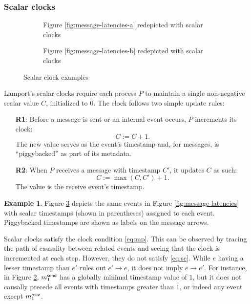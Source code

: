 \documentclass[]             %
{NASA}                       %
\theoremstyle{definition}
\newtheorem{example}[theorem]{Example}
\begin{document}
\subsubsection{Scalar clocks}
\label{sssec:scalar-clocks}
\begin{figure}
  \setlength\belowcaptionskip{5ex}

  \begin{subfigure}{1\textwidth}
    \centering 
    \caption{Figure \ref{fig:message-latencies-a} redepicted with scalar clocks}
    \label{fig:message-latencies-scalar-a}
  \end{subfigure}

  \begin{subfigure}{1\textwidth}
    \centering 
    \caption{Figure \ref{fig:message-latencies-b} redepicted with scalar clocks}
    \label{fig:message-latencies-scalar-b}
  \end{subfigure}

  \caption{Scalar clock examples}
  \label{fig:message-latencies-scalar}
\end{figure}

Lamport's scalar clocks \cite{1978:lamportclocks} require each
process $P$ to maintain a single non-negative scalar value $C$,
initialized to $0$. The clock follows two simple update rules:
\begin{enumerate}
\item[\textbf{R1}:] Before a message is sent or an internal event occurs, $P$
  increments its clock:
  \[C := C + 1.\]
  The new value serves as the event's timestamp and, for messages, is ``piggybacked''
  as part of its metadata.
\item[\textbf{R2}:] When $P$ receives a message with timestamp $C'$, it
  updates $C$ as such:
  \[C := \max(C, C') + 1.\]
  The value is the receive event's timestamp.
\end{enumerate}

\begin{example}
  Figure \ref{fig:message-latencies-scalar} depicts the same events in
  Figure \ref{fig:message-latencies} with scalar timestamps (shown in
  parentheses) assigned to each event. Piggybacked timestamps are
  shown as labels on the message arrows.
\end{example}

Scalar clocks satisfy the clock condition \eqref{eq:mp}. This can be
observed by tracing the path of causality between related events and
seeing that the clock is incremented at each step. However, they do
not satisfy \eqref{eq:sc}.  While $e$ having a lesser timestamp than
$e'$ rules out $e' \to e$, it does not imply $e \to e'$. For instance,
in Figure \ref{fig:message-latencies-scalar-b}, $m_{1}^{\mathsf{send}}$ has a
globally minimal timestamp value of $1$, but it does not causally
precede all events with timestamps greater than $1$, or indeed any
event except $m_{1}^{\mathsf{recv}}$.
\end{document}

